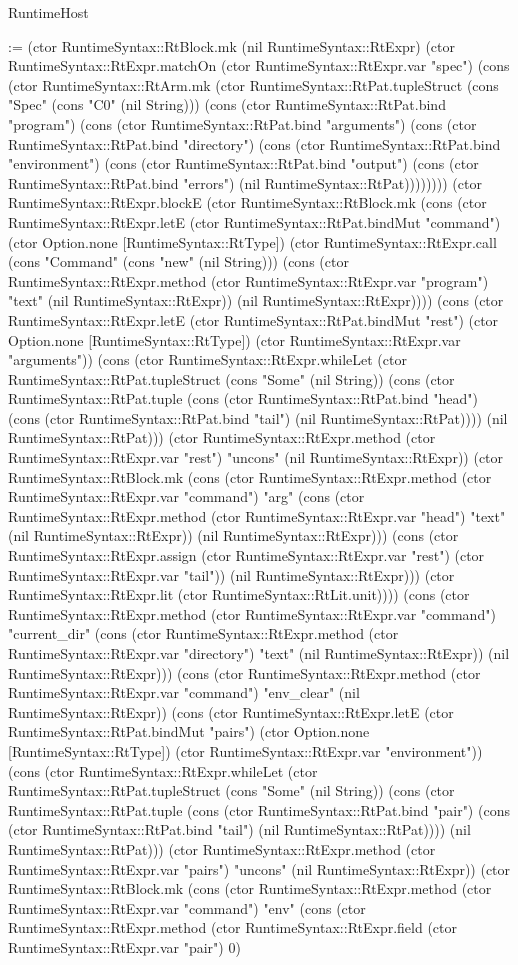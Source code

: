 \begin{lexlean}{RuntimeHost}
\begin{semanticmodule}
{:= (ctor RuntimeSyntax::RtBlock.mk (nil RuntimeSyntax::RtExpr) (ctor RuntimeSyntax::RtExpr.matchOn (ctor RuntimeSyntax::RtExpr.var "spec") (cons (ctor RuntimeSyntax::RtArm.mk (ctor RuntimeSyntax::RtPat.tupleStruct (cons "Spec" (cons "C0" (nil String))) (cons (ctor RuntimeSyntax::RtPat.bind "program") (cons (ctor RuntimeSyntax::RtPat.bind "arguments") (cons (ctor RuntimeSyntax::RtPat.bind "directory") (cons (ctor RuntimeSyntax::RtPat.bind "environment") (cons (ctor RuntimeSyntax::RtPat.bind "output") (cons (ctor RuntimeSyntax::RtPat.bind "errors") (nil RuntimeSyntax::RtPat)))))))) (ctor RuntimeSyntax::RtExpr.blockE (ctor RuntimeSyntax::RtBlock.mk (cons (ctor RuntimeSyntax::RtExpr.letE (ctor RuntimeSyntax::RtPat.bindMut "command") (ctor Option.none [RuntimeSyntax::RtType]) (ctor RuntimeSyntax::RtExpr.call (cons "Command" (cons "new" (nil String))) (cons (ctor RuntimeSyntax::RtExpr.method (ctor RuntimeSyntax::RtExpr.var "program") "text" (nil RuntimeSyntax::RtExpr)) (nil RuntimeSyntax::RtExpr)))) (cons (ctor RuntimeSyntax::RtExpr.letE (ctor RuntimeSyntax::RtPat.bindMut "rest") (ctor Option.none [RuntimeSyntax::RtType]) (ctor RuntimeSyntax::RtExpr.var "arguments")) (cons (ctor RuntimeSyntax::RtExpr.whileLet (ctor RuntimeSyntax::RtPat.tupleStruct (cons "Some" (nil String)) (cons (ctor RuntimeSyntax::RtPat.tuple (cons (ctor RuntimeSyntax::RtPat.bind "head") (cons (ctor RuntimeSyntax::RtPat.bind "tail") (nil RuntimeSyntax::RtPat)))) (nil RuntimeSyntax::RtPat))) (ctor RuntimeSyntax::RtExpr.method (ctor RuntimeSyntax::RtExpr.var "rest") "uncons" (nil RuntimeSyntax::RtExpr)) (ctor RuntimeSyntax::RtBlock.mk (cons (ctor RuntimeSyntax::RtExpr.method (ctor RuntimeSyntax::RtExpr.var "command") "arg" (cons (ctor RuntimeSyntax::RtExpr.method (ctor RuntimeSyntax::RtExpr.var "head") "text" (nil RuntimeSyntax::RtExpr)) (nil RuntimeSyntax::RtExpr))) (cons (ctor RuntimeSyntax::RtExpr.assign (ctor RuntimeSyntax::RtExpr.var "rest") (ctor RuntimeSyntax::RtExpr.var "tail")) (nil RuntimeSyntax::RtExpr))) (ctor RuntimeSyntax::RtExpr.lit (ctor RuntimeSyntax::RtLit.unit)))) (cons (ctor RuntimeSyntax::RtExpr.method (ctor RuntimeSyntax::RtExpr.var "command") "current_dir" (cons (ctor RuntimeSyntax::RtExpr.method (ctor RuntimeSyntax::RtExpr.var "directory") "text" (nil RuntimeSyntax::RtExpr)) (nil RuntimeSyntax::RtExpr))) (cons (ctor RuntimeSyntax::RtExpr.method (ctor RuntimeSyntax::RtExpr.var "command") "env_clear" (nil RuntimeSyntax::RtExpr)) (cons (ctor RuntimeSyntax::RtExpr.letE (ctor RuntimeSyntax::RtPat.bindMut "pairs") (ctor Option.none [RuntimeSyntax::RtType]) (ctor RuntimeSyntax::RtExpr.var "environment")) (cons (ctor RuntimeSyntax::RtExpr.whileLet (ctor RuntimeSyntax::RtPat.tupleStruct (cons "Some" (nil String)) (cons (ctor RuntimeSyntax::RtPat.tuple (cons (ctor RuntimeSyntax::RtPat.bind "pair") (cons (ctor RuntimeSyntax::RtPat.bind "tail") (nil RuntimeSyntax::RtPat)))) (nil RuntimeSyntax::RtPat))) (ctor RuntimeSyntax::RtExpr.method (ctor RuntimeSyntax::RtExpr.var "pairs") "uncons" (nil RuntimeSyntax::RtExpr)) (ctor RuntimeSyntax::RtBlock.mk (cons (ctor RuntimeSyntax::RtExpr.method (ctor RuntimeSyntax::RtExpr.var "command") "env" (cons (ctor RuntimeSyntax::RtExpr.method (ctor RuntimeSyntax::RtExpr.field (ctor RuntimeSyntax::RtExpr.var "pair") 0) }
\end{semanticmodule}
\end{lexlean}

